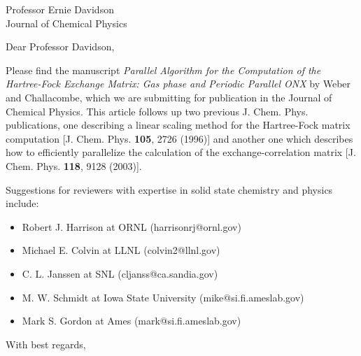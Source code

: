 
\pagestyle{empty}

\signature{V. Weber}

\address{
V. Weber \\
(valeryw@lanl.gov) \\
Theoretical Division \\
Group T-12, MS B268 \\
Los Alamos National Laboratory \\
Los Alamos, NM 87545 }

\date{November 30, 2005}

\begin{letter}{
Professor Ernie Davidson\\
Journal of Chemical Physics
}

\opening{Dear Professor Davidson,}

Please find the manuscript {\em Parallel Algorithm for the Computation of 
the Hartree-Fock Exchange Matrix: Gas phase and Periodic Parallel ONX} 
by Weber and Challacombe, which we are 
submitting for publication in the Journal of Chemical Physics. 
This article follows up two previous J. Chem. Phys. publications, 
one describing a linear scaling method for
the Hartree-Fock  matrix computation [J. Chem. Phys. {\bf 105}, 2726 (1996)] and
another one which describes how to efficiently parallelize the calculation
of the exchange-correlation matrix [J. Chem. Phys. {\bf 118}, 9128 (2003)].

Suggestions for reviewers with expertise in solid state chemistry and physics include: 
\begin{itemize}
\item Robert J. Harrison at ORNL (harrisonrj@ornl.gov)
\item Michael E. Colvin at LLNL (colvin2@llnl.gov)
\item C. L. Janssen at SNL (cljanss@ca.sandia.gov)
\item M. W. Schmidt at Iowa State University (mike@si.fi.ameslab.gov)
\item Mark S. Gordon at Ames (mark@si.fi.ameslab.gov)
\end{itemize}

\closing{With best regards,}
\end{letter}

